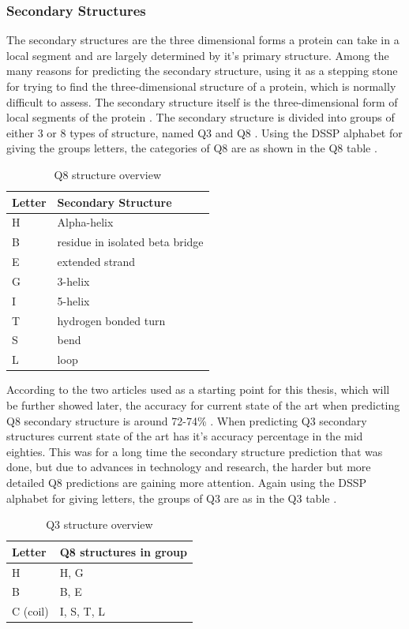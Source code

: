 \subsubsection{Secondary Structures}
The secondary structures are the three dimensional forms a protein can take in a local segment and are largely determined by it's primary structure. Among the many reasons for predicting the secondary structure, using it as a stepping stone for trying to find the three-dimensional structure of a protein, which is normally difficult to assess. The secondary structure itself is the three-dimensional form of local segments of the protein \citep[p.~2]{qi-et-al-2012}.
The secondary structure is divided into groups of either 3 or 8 types of structure, named Q3 and Q8 \citep{zhou-and-troyanskaya-2014}. 
Using the DSSP alphabet \citep{kabsch-and-sander-1983} 
for giving the groups letters, the categories of Q8 are as shown in the Q8 table \citep{qi-et-al-2012}.
\begin{table}[H]
\caption{Q8 structure overview}
\centering
\begin{tabular}{l|l}
\hline 
Letter	& Secondary Structure 			\\ \hline
H	& Alpha-helix						\\
B	& residue in isolated beta bridge	\\
E	& extended strand					\\
G	& 3-helix							\\
I	& 5-helix							\\
T	& hydrogen bonded turn				\\
S	& bend								\\
L	& loop								\\
\end{tabular}
\end{table}
According to the two articles used as a starting point for this thesis, which will be further showed later, the accuracy for current state of the art when predicting Q8 secondary structure is around 72-74\% \citep{zhou-and-troyanskaya-2014, qi-et-al-2012}. 
When predicting Q3 secondary structures current state of the art has it's accuracy percentage in the mid eighties. This was for a long time the secondary structure prediction that was done, but due to advances in technology and research, the harder but more detailed Q8 predictions are gaining more attention. 
Again using the DSSP alphabet for giving letters, the groups of Q3 are as in the Q3 table \citep{qi-et-al-2012}.
\begin{table}[H]
\caption{Q3 structure overview}
\centering
\begin{tabular}{l|l}
\hline
Letter		& Q8 structures in group	\\ \hline
H			& H, G						\\
B			& B, E						\\
C (coil)	& I, S, T, L				\\
\end{tabular}
\end{table}


